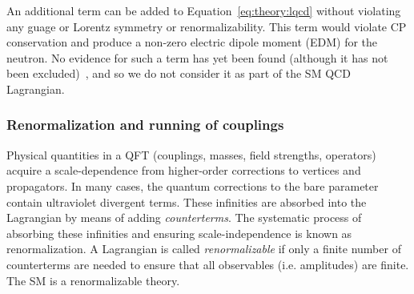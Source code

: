 An additional term can be added to Equation~\ref{eq:theory:lqcd} without violating any guage or Lorentz symmetry or renormalizability.
This term would violate CP conservation and produce a non-zero electric dipole moment (EDM) for the neutron.
No evidence for such a term has yet been found (although it has not been excluded)~\cite{nedm1}, and so we do not consider it as part of the SM QCD Lagrangian. 

\subsubsection{Renormalization and running of couplings}

Physical quantities in a QFT (couplings, masses, field strengths, operators) acquire a scale-dependence from higher-order corrections to vertices and propagators. 
In many cases, the quantum corrections to the bare parameter contain ultraviolet divergent terms.
These infinities are absorbed into the Lagrangian by means of adding \emph{counterterms}. 
The systematic process of absorbing these infinities and ensuring scale-independence is known as renormalization.
A Lagrangian is called \emph{renormalizable} if only a finite number of counterterms are needed to ensure that all observables (i.e. amplitudes) are finite. 
The SM is a renormalizable theory.

